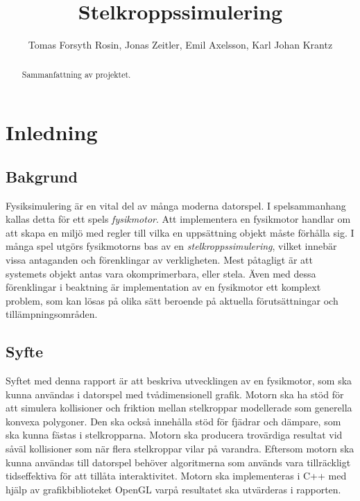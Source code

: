 \documentclass[a4paper,12pt,twopage,swedish]{article}
\begin{document}
\title{Stelkroppssimulering}
\author{Tomas Forsyth Rosin, Jonas Zeitler, Emil Axelsson, Karl Johan Krantz}
\begin{titlepage}
\maketitle
\thispagestyle{empty}
\end{titlepage}
\setcounter{page}{1}
\begin{abstract}
Sammanfattning av projektet.
\end{abstract}
\clearpage
\tableofcontents
\clearpage
\listoffigures
\clearpage
\listoftables
\clearpage
\setcounter{page}{1}

\section{Inledning}

\subsection{Bakgrund}
Fysiksimulering är en vital del av många moderna datorspel. I spelsammanhang kallas detta för ett spels \emph{fysikmotor}. Att implementera en fysikmotor handlar om att skapa en miljö med regler till vilka en uppsättning objekt måste förhålla sig. I många spel utgörs fysikmotorns bas av en \emph{stelkroppssimulering}, vilket innebär vissa antaganden och förenklingar av verkligheten. Mest påtagligt är att systemets objekt antas vara okomprimerbara, eller stela. Även med dessa förenklingar i beaktning är implementation av en fysikmotor ett komplext problem, som kan lösas på olika sätt beroende på aktuella förutsättningar och tillämpningsområden.

\subsection{Syfte}
Syftet med denna rapport är att beskriva utvecklingen av en fysikmotor, som ska kunna användas i datorspel med tvådimensionell grafik. Motorn ska ha stöd för att simulera kollisioner och friktion mellan stelkroppar modellerade som generella konvexa polygoner. Den ska också innehålla stöd för fjädrar och dämpare, som ska kunna fästas i stelkropparna. Motorn ska producera trovärdiga resultat vid såväl kollisioner som när flera stelkroppar vilar på varandra. Eftersom motorn ska kunna användas till datorspel behöver algoritmerna som används vara tillräckligt tidseffektiva för att tillåta interaktivitet. Motorn ska implementeras i C++ med hjälp av grafikbiblioteket OpenGL varpå resultatet ska utvärderas i rapporten.
\end{document}
